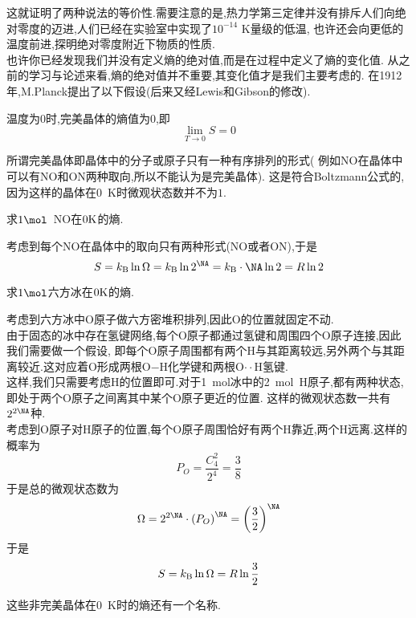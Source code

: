 \documentclass{ctexart}
\begin{document}
这就证明了两种说法的等价性.需要注意的是,热力学第三定律并没有排斥人们向绝对零度的迈进,人们已经在实验室中实现了$10^{-14}\text{ K}$量级的低温,%
也许还会向更低的温度前进,探明绝对零度附近下物质的性质.\vspace{12pt}\\
\indent 也许你已经发现我们并没有定义熵的绝对值,而是在过程中定义了熵的变化值.%
从之前的学习与论述来看,熵的绝对值并不重要,其变化值才是我们主要考虑的.%
在1912年,M.Planck提出了以下假设(后来又经Lewis和Gibson的修改).
\begin{theorem}[3D.3.1 完美晶体的熵]
    温度为$0$时,完美晶体的熵值为$0$,即
    \[\lim_{T\to0}S=0\]

\end{theorem}
所谓完美晶体即晶体中的分子或原子只有一种有序排列的形式(%
例如NO在晶体中可以有NO和ON两种取向,所以不能认为是完美晶体).%
这是符合Boltzmann公式的,因为这样的晶体在$0$\ K时微观状态数并不为$1$.
\begin{exercise}[E.3D.1]
    求$1\mol$\ NO在$0\text K$的熵.
\end{exercise}
\begin{solution}
    考虑到每个NO在晶体中的取向只有两种形式(NO或者ON),于是
    \[S=k_\text B\ln\Omega=k_\text B\ln 2^{\NA}=k_\text B\cdot\NA\ln2=R\ln2\]

\end{solution}
\begin{exercise}[E.3D.2]
    求$1\mol$六方冰\footnotemark 在$0\text K$的熵.
\end{exercise}
\begin{solution}
    考虑到六方冰中O原子做六方密堆积排列,因此O的位置就固定不动.\\
    由于固态的冰中存在氢键网络,每个O原子都通过氢键和周围四个O原子连接,因此我们需要做一个假设,%
    即每个O原子周围都有两个H与其距离较远,另外两个与其距离较近.这对应着O形成两根O$-$H化学键和两根O$\cdot\cdot$H氢键.\\
    这样,我们只需要考虑H的位置即可.对于1\ mol冰中的2\ mol\ H原子,都有两种状态,即处于两个O原子之间离其中某个O原子更近的位置.%
    这样的微观状态数一共有$2^{2\NA}$种.\\
    考虑到O原子对H原子的位置,每个O原子周围恰好有两个H靠近,两个H远离.这样的概率为
    \[P_O=\dfrac{C_4^2}{2^4}=\dfrac{3}{8}\]
    于是总的微观状态数为
    \[\Omega=2^{2\NA}\cdot\left(P_O\right)^{\NA}=\left(\dfrac32\right)^\NA\]
    于是
    \[S=k_\text B\ln\Omega=R\ln\dfrac32\]

\end{solution}
这些非完美晶体在0\ K时的熵还有一个名称.
\end{document}
